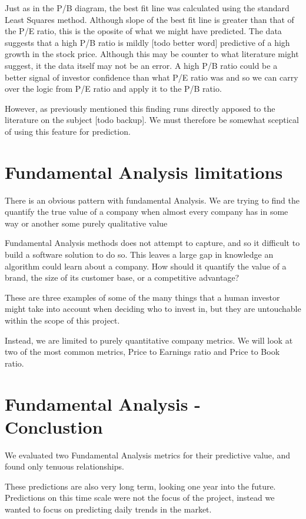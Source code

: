 \documentclass{report}
\begin{document}
Just as in the P/B diagram, the best fit line was calculated using the standard Least Squares method. Although slope of the best fit line is greater than that of the P/E ratio, this is the oposite of what we might have predicted. The data suggests that a high P/B ratio is mildly [todo better word] predictive of a high growth in the stock price. Although this may be counter to what literature might suggest, it the data itself may not be an error. A high P/B ratio could be a better signal of investor confidence than what P/E ratio was and so we can carry over the logic from P/E ratio and apply it to the P/B ratio. 

However, as previously mentioned this finding runs directly apposed to the literature on the subject [todo backup]. We must therefore be somewhat sceptical of using this feature for prediction. 

\section{Fundamental Analysis limitations}

There is an obvious pattern with fundamental Analysis. We are trying to find the quantify the true value of a company when almost every company has in some way or another some purely qualitative value

Fundamental Analysis methods does not attempt to capture, and so it difficult to build a software solution to do so. This leaves a large gap in knowledge an algorithm could learn about a company. How should it quantify the value of a brand, the size of its customer base, or a competitive advantage?

These are three examples of some of the many things that a human investor might take into account when deciding who to invest in, but they are untouchable within the scope of this project. 

Instead, we are limited to purely quantitative company metrics. We will look at two of the most common metrics, Price to Earnings ratio and Price to Book ratio.

\section{Fundamental Analysis - Conclustion}

We evaluated two Fundamental Analysis metrics for their predictive value, and found only tenuous relationships.  

These predictions are also very long term, looking one year into the future. Predictions on this time scale were not the focus of the project, instead we wanted to focus on predicting daily trends in the market.
\end{document}
